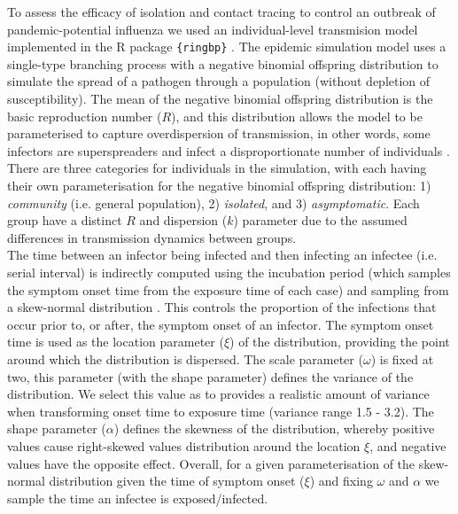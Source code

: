 \documentclass{article}
\begin{document}
To assess the efficacy of isolation and contact tracing to control an outbreak of pandemic-potential influenza we used an individual-level transmision model implemented in the R package \texttt{\{ringbp\}} \citep{hellewellRingbpSimulateEvaluate2025}. The epidemic simulation model uses a single-type branching process with a negative binomial offspring distribution to simulate the spread of a pathogen through a population (without depletion of susceptibility). The mean of the negative binomial offspring distribution is the basic reproduction number ($R$), and this distribution allows the model to be parameterised to capture overdispersion of transmission, in other words, some infectors are superspreaders and infect a disproportionate number of individuals \citep{lloyd-smithSuperspreadingEffectIndividual2005, kucharskiEarlyDynamicsTransmission2020}. \\

There are three categories for individuals in the simulation, with each having their own parameterisation for the negative binomial offspring distribution: 1) \textit{community} (i.e. general population), 2) \textit{isolated}, and 3) \textit{asymptomatic}. Each group have a distinct $R$ and dispersion ($k$) parameter due to the assumed differences in transmission dynamics between groups. \\

The time between an infector being infected and then infecting an infectee (i.e. serial interval) is indirectly computed using the incubation period (which samples the symptom onset time from the exposure time of each case) and sampling from a skew-normal distribution \citep{azzaliniClassDistributionsWhich1985}. This controls the proportion of the infections that occur prior to, or after, the symptom onset of an infector. The symptom onset time is used as the location parameter ($\xi$) of the distribution, providing the point around which the distribution is dispersed. The scale parameter ($\omega$) is fixed at two, this parameter (with the shape parameter) defines the variance of the distribution. We select this value as to provides a realistic amount of variance when transforming onset time to exposure time (variance range 1.5 - 3.2). The shape parameter ($\alpha$) defines the skewness of the distribution, whereby positive values cause right-skewed values distribution around the location $\xi$, and negative values have the opposite effect. Overall, for a given parameterisation of the skew-normal distribution given the time of symptom onset ($\xi$) and fixing $\omega$ and $\alpha$ we sample the time an infectee is exposed/infected. \\
\end{document}
